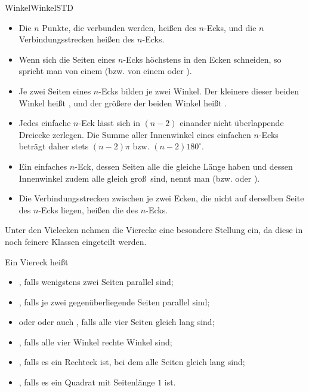 \begin{MXContent}{Winkel}{Winkel}{STD}
\begin{MInfo}
\begin{itemize}
 \item Die $n$ Punkte, die verbunden werden, hei\ss en
        des $n$-Ecks, und
       die $n$ Verbindungsstrecken hei\ss en
        des $n$-Ecks.
   \item Wenn sich die Seiten eines $n$-Ecks h\"ochstens in den Ecken schneiden, so spricht man von einem  (bzw. von einem  oder ).  
 \item Je zwei Seiten eines $n$-Ecks bilden je zwei Winkel.
Der kleinere dieser beiden Winkel hei\ss t
,
       und der gr\"o\ss ere der beiden Winkel hei\ss t
       .
		\item Jedes einfache $n$-Eck l\"asst sich in $(n-2)$ einander nicht \"uberlappende Dreiecke zerlegen. Die Summe aller Innenwinkel eines einfachen $n$-Ecks betr\"agt daher stets $(n-2)\pi$ bzw. $(n-2)180^\circ$.
 \item Ein einfaches $n$-Eck, dessen Seiten alle die gleiche L\"ange haben und dessen Innenwinkel zudem alle gleich gro\ss\ sind, nennt man
 (bzw.  oder ).
\item Die Verbindungsstrecken zwischen je zwei Ecken, die nicht auf derselben Seite des $n$-Ecks liegen, hei\ss en die  des $n$-Ecks.
\end{itemize}
\end{MInfo}

Unter den Vielecken nehmen die Vierecke eine besondere Stellung ein, da diese in noch feinere Klassen eingeteilt werden.

\begin{MInfo}%
Ein Viereck hei\ss t
\begin{itemize}
 \item {}, falls wenigstens zwei Seiten parallel sind;
 \item {}, falls je zwei gegen\"uberliegende Seiten parallel sind;
 \item {} oder  oder auch , falls alle vier Seiten gleich lang sind;
 \item {}, falls alle vier Winkel rechte Winkel sind;
 \item {}, falls es ein Rechteck ist, bei dem alle Seiten gleich lang sind;
 \item {}, falls es ein Quadrat mit Seitenl\"ange $1$ ist.
\end{itemize}
\end{MInfo}


\end{MXContent}
